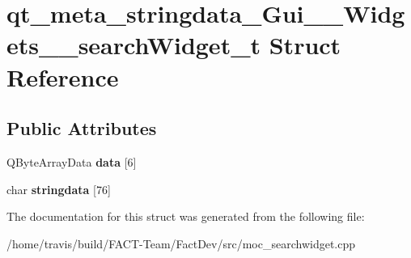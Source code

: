 \hypertarget{structqt__meta__stringdata__Gui____Widgets____searchWidget__t}{\section{qt\-\_\-meta\-\_\-stringdata\-\_\-\-Gui\-\_\-\-\_\-\-Widgets\-\_\-\-\_\-search\-Widget\-\_\-t Struct Reference}
\label{structqt__meta__stringdata__Gui____Widgets____searchWidget__t}
}
\subsection*{Public Attributes}
\begin{DoxyCompactItemize}
\item 
\hypertarget{structqt__meta__stringdata__Gui____Widgets____searchWidget__t_a7dd7bacb0001aa752673c86aa544603d}{Q\-Byte\-Array\-Data {\bfseries data} \mbox{[}6\mbox{]}}\label{structqt__meta__stringdata__Gui____Widgets____searchWidget__t_a7dd7bacb0001aa752673c86aa544603d}

\item 
\hypertarget{structqt__meta__stringdata__Gui____Widgets____searchWidget__t_ada1cbe8be1f6357313ee00fee1d3179c}{char {\bfseries stringdata} \mbox{[}76\mbox{]}}\label{structqt__meta__stringdata__Gui____Widgets____searchWidget__t_ada1cbe8be1f6357313ee00fee1d3179c}

\end{DoxyCompactItemize}


The documentation for this struct was generated from the following file\-:\begin{DoxyCompactItemize}
\item 
/home/travis/build/\-F\-A\-C\-T-\/\-Team/\-Fact\-Dev/src/moc\-\_\-searchwidget.\-cpp\end{DoxyCompactItemize}
